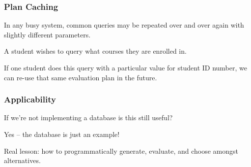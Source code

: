 \begin{frame}
\frametitle{Plan Caching}

In any busy system, common queries may be repeated over and over again with slightly different parameters. 

A student wishes to query what courses they are enrolled in. 

If one student does this query with a particular value for student ID number, we can re-use that same evaluation plan in the future.

\end{frame}


\begin{frame}
\frametitle{Applicability}

If we're not implementing a database is this still useful?

Yes -- the database is just an example!

Real lesson: how to programmatically generate, evaluate, and choose amongst alternatives.

\end{frame}




